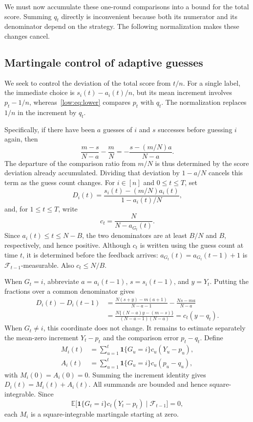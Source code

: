 \documentclass[11pt,reqno]{amsart}
\numberwithin{equation}{section}
\theoremstyle{remark}
\theoremstyle{definition}
\newcommand{\ind}{\mathbf 1}
\begin{document}
We must now accumulate these one-round comparisons into a bound for the total score. Summing $q_t$ directly is inconvenient because both its numerator and its denominator depend on the strategy. The following normalization makes these changes cancel.

\subsection{Martingale control of adaptive guesses}\label{sec:martingale}
We seek to control the deviation of the total score from $t/n$. For a single label, the immediate choice is $s_i(t)-a_i(t)/n$, but its mean increment involves $p_t-1/n$, whereas~\eqref{low:eq:lower} compares $p_t$ with $q_t$. The normalization replaces $1/n$ in the increment by $q_t$.

Specifically, if there have been $a$ guesses of $i$ and $s$ successes before guessing $i$ again, then
\[
 \frac{m-s}{N-a}-\frac mN
 =-\frac{s-(m/N)a}{N-a}.
\]
The departure of the comparison ratio from $m/N$ is thus determined by the score deviation already accumulated. Dividing that deviation by $1-a/N$ cancels this term as the guess count changes. For $i\in[n]$ and $0\le t\le T$, set
\[
 D_i(t)=\frac{s_i(t)-(m/N)a_i(t)}{1-a_i(t)/N},
\]
and, for $1\le t\le T$, write
\[
 c_t=\frac{N}{N-a_{G_t}(t)}.
\]
Since $a_i(t)\le t\le N-B$, the two denominators are at least $B/N$ and $B$, respectively, and hence positive. Although $c_t$ is written using the guess count at time $t$, it is determined before the feedback arrives: $a_{G_t}(t)=a_{G_t}(t-1)+1$ is $\mathcal F_{t-1}$-measurable. Also $c_t\le N/B$.

When $G_t=i$, abbreviate $a=a_i(t-1)$, $s=s_i(t-1)$, and $y=Y_t$. Putting the fractions over a common denominator gives
\begin{align*}
 D_i(t)-D_i(t-1)
 &=\frac{N(s+y)-m(a+1)}{N-a-1}-\frac{Ns-ma}{N-a}\\
 &=\frac{N\{(N-a)y-(m-s)\}}{(N-a-1)(N-a)}
 =c_t(y-q_t).
\end{align*}
When $G_t\ne i$, this coordinate does not change. It remains to estimate separately the mean-zero increment $Y_t-p_t$ and the comparison error $p_t-q_t$. Define
\begin{align*}
 M_i(t)&=\sum_{u=1}^t\ind\{G_u=i\}c_u(Y_u-p_u),\\
 A_i(t)&=\sum_{u=1}^t\ind\{G_u=i\}c_u(p_u-q_u),
\end{align*}
with $M_i(0)=A_i(0)=0$. Summing the increment identity gives $D_i(t)=M_i(t)+A_i(t)$. All summands are bounded and hence square-integrable. Since
\[
 \mathbb E\bigl[\ind\{G_t=i\}c_t(Y_t-p_t)\mid\mathcal F_{t-1}\bigr]=0,
\]
each $M_i$ is a square-integrable martingale starting at zero.
\end{document}
